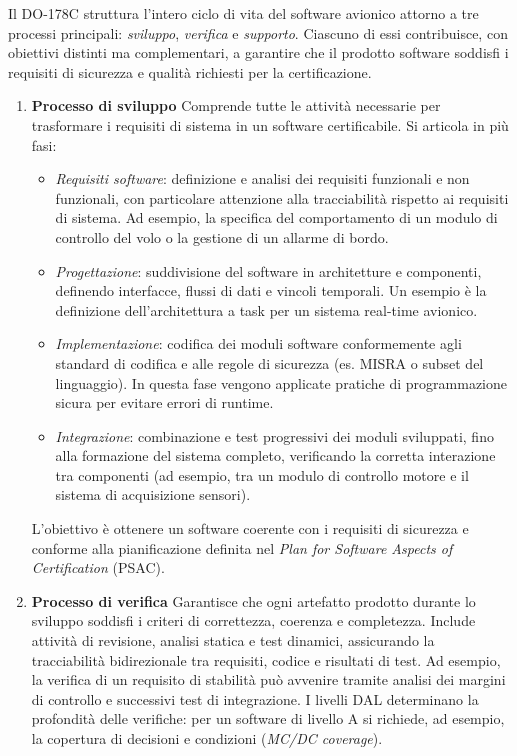 \documentclass[italian, Lau, oneside]{sapthesis} %
\begin{document}
Il DO-178C struttura l’intero ciclo di vita del software avionico attorno a tre processi principali: \emph{sviluppo}, \emph{verifica} e \emph{supporto}.  
Ciascuno di essi contribuisce, con obiettivi distinti ma complementari, a garantire che il prodotto software soddisfi i requisiti di sicurezza e qualità richiesti per la certificazione.

\begin{enumerate}
    \item \textbf{Processo di sviluppo}  
    Comprende tutte le attività necessarie per trasformare i requisiti di sistema in un software certificabile.  
    Si articola in più fasi:
    \begin{itemize}
        \item \emph{Requisiti software}: definizione e analisi dei requisiti funzionali e non funzionali, con particolare attenzione alla tracciabilità rispetto ai requisiti di sistema. Ad esempio, la specifica del comportamento di un modulo di controllo del volo o la gestione di un allarme di bordo.
        \item \emph{Progettazione}: suddivisione del software in architetture e componenti, definendo interfacce, flussi di dati e vincoli temporali. Un esempio è la definizione dell’architettura a task per un sistema real-time avionico.
        \item \emph{Implementazione}: codifica dei moduli software conformemente agli standard di codifica e alle regole di sicurezza (es. MISRA o subset del linguaggio). In questa fase vengono applicate pratiche di programmazione sicura per evitare errori di runtime.
        \item \emph{Integrazione}: combinazione e test progressivi dei moduli sviluppati, fino alla formazione del sistema completo, verificando la corretta interazione tra componenti (ad esempio, tra un modulo di controllo motore e il sistema di acquisizione sensori).
    \end{itemize}
    L’obiettivo è ottenere un software coerente con i requisiti di sicurezza e conforme alla pianificazione definita nel \emph{Plan for Software Aspects of Certification} (PSAC).

    \item \textbf{Processo di verifica}  
    Garantisce che ogni artefatto prodotto durante lo sviluppo soddisfi i criteri di correttezza, coerenza e completezza.  
    Include attività di revisione, analisi statica e test dinamici, assicurando la tracciabilità bidirezionale tra requisiti, codice e risultati di test.  
    Ad esempio, la verifica di un requisito di stabilità può avvenire tramite analisi dei margini di controllo e successivi test di integrazione.  
    I livelli DAL determinano la profondità delle verifiche: per un software di livello A si richiede, ad esempio, la copertura di decisioni e condizioni (\emph{MC/DC coverage}).


\end{enumerate}
\end{document}
